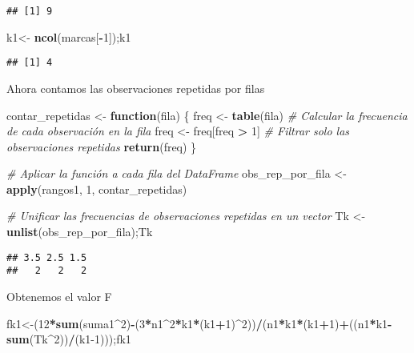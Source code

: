 \documentclass[
]{article}
\newenvironment{Shaded}{\begin{snugshade}}{\end{snugshade}}
\newcommand{\CommentTok}[1]{\textcolor[rgb]{0.56,0.35,0.01}{\textit{#1}}}
\newcommand{\ControlFlowTok}[1]{\textcolor[rgb]{0.13,0.29,0.53}{\textbf{#1}}}
\newcommand{\DecValTok}[1]{\textcolor[rgb]{0.00,0.00,0.81}{#1}}
\newcommand{\FunctionTok}[1]{\textcolor[rgb]{0.13,0.29,0.53}{\textbf{#1}}}
\newcommand{\NormalTok}[1]{#1}
\newcommand{\OtherTok}[1]{\textcolor[rgb]{0.56,0.35,0.01}{#1}}
\newcommand{\SpecialCharTok}[1]{\textcolor[rgb]{0.81,0.36,0.00}{\textbf{#1}}}
\begin{document}
\begin{verbatim}
## [1] 9
\end{verbatim}

\begin{Shaded}
\begin{Highlighting}[]
\NormalTok{k1}\OtherTok{\textless{}{-}} \FunctionTok{ncol}\NormalTok{(marcas[}\SpecialCharTok{{-}}\DecValTok{1}\NormalTok{]);k1}
\end{Highlighting}
\end{Shaded}

\begin{verbatim}
## [1] 4
\end{verbatim}

Ahora contamos las observaciones repetidas por filas

\begin{Shaded}
\begin{Highlighting}[]
\NormalTok{contar\_repetidas }\OtherTok{\textless{}{-}} \ControlFlowTok{function}\NormalTok{(fila) \{}
\NormalTok{  freq }\OtherTok{\textless{}{-}} \FunctionTok{table}\NormalTok{(fila)  }\CommentTok{\# Calcular la frecuencia de cada observación en la fila}
\NormalTok{  freq }\OtherTok{\textless{}{-}}\NormalTok{ freq[freq }\SpecialCharTok{\textgreater{}} \DecValTok{1}\NormalTok{]  }\CommentTok{\# Filtrar solo las observaciones repetidas}
  \FunctionTok{return}\NormalTok{(freq)}
\NormalTok{\}}

\CommentTok{\# Aplicar la función a cada fila del DataFrame}
\NormalTok{obs\_rep\_por\_fila }\OtherTok{\textless{}{-}} \FunctionTok{apply}\NormalTok{(rangos1, }\DecValTok{1}\NormalTok{, contar\_repetidas)}

\CommentTok{\# Unificar las frecuencias de observaciones repetidas en un vector}
\NormalTok{Tk }\OtherTok{\textless{}{-}} \FunctionTok{unlist}\NormalTok{(obs\_rep\_por\_fila);Tk}
\end{Highlighting}
\end{Shaded}

\begin{verbatim}
## 3.5 2.5 1.5 
##   2   2   2
\end{verbatim}

Obtenemos el valor F

\begin{Shaded}
\begin{Highlighting}[]
\NormalTok{fk1}\OtherTok{\textless{}{-}}\NormalTok{(}\DecValTok{12}\SpecialCharTok{*}\FunctionTok{sum}\NormalTok{(suma1}\SpecialCharTok{\^{}}\DecValTok{2}\NormalTok{)}\SpecialCharTok{{-}}\NormalTok{(}\DecValTok{3}\SpecialCharTok{*}\NormalTok{n1}\SpecialCharTok{\^{}}\DecValTok{2}\SpecialCharTok{*}\NormalTok{k1}\SpecialCharTok{*}\NormalTok{(k1}\SpecialCharTok{+}\DecValTok{1}\NormalTok{)}\SpecialCharTok{\^{}}\DecValTok{2}\NormalTok{))}\SpecialCharTok{/}\NormalTok{(n1}\SpecialCharTok{*}\NormalTok{k1}\SpecialCharTok{*}\NormalTok{(k1}\SpecialCharTok{+}\DecValTok{1}\NormalTok{)}\SpecialCharTok{+}\NormalTok{((n1}\SpecialCharTok{*}\NormalTok{k1}\SpecialCharTok{{-}}\FunctionTok{sum}\NormalTok{(Tk}\SpecialCharTok{\^{}}\DecValTok{2}\NormalTok{))}\SpecialCharTok{/}\NormalTok{(k1}\DecValTok{{-}1}\NormalTok{)));fk1}
\end{Highlighting}
\end{Shaded}
\end{document}
